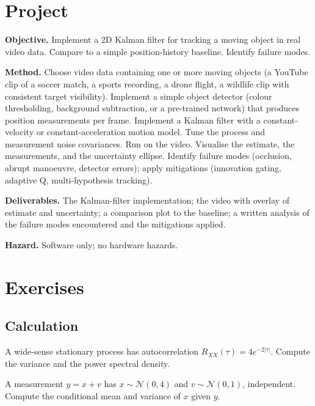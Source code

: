 \section{Project}

\begin{project}
\textbf{Objective.} Implement a 2D Kalman filter for tracking a moving object in real video data. Compare to a simple position-history baseline. Identify failure modes.

\textbf{Method.} Choose video data containing one or more moving objects (a YouTube clip of a soccer match, a sports recording, a drone flight, a wildlife clip with consistent target visibility). Implement a simple object detector (colour thresholding, background subtraction, or a pre-trained network) that produces position measurements per frame. Implement a Kalman filter with a constant-velocity or constant-acceleration motion model. Tune the process and measurement noise covariances. Run on the video. Visualise the estimate, the measurements, and the uncertainty ellipse. Identify failure modes (occlusion, abrupt manoeuvre, detector errors); apply mitigations (innovation gating, adaptive Q, multi-hypothesis tracking).

\textbf{Deliverables.} The Kalman-filter implementation; the video with overlay of estimate and uncertainty; a comparison plot to the baseline; a written analysis of the failure modes encountered and the mitigations applied.

\textbf{Hazard.} Software only; no hardware hazards.
\end{project}

\section{Exercises}

\subsection*{Calculation}

\begin{exercise}
A wide-sense stationary process has autocorrelation $R_{XX}(\tau) = 4 e^{-2|\tau|}$. Compute the variance and the power spectral density.
\end{exercise}

\begin{exercise}
A measurement $y = x + v$ has $x \sim \mathcal{N}(0, 4)$ and $v \sim \mathcal{N}(0, 1)$, independent. Compute the conditional mean and variance of $x$ given $y$.
\end{exercise}

